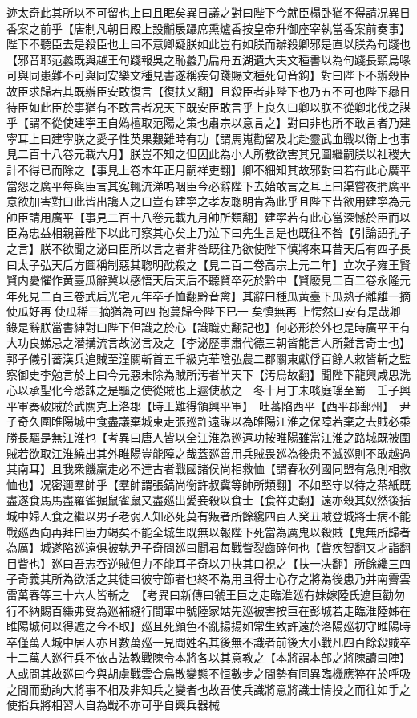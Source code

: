 迹太奇此其所以不可留也上曰且眠矣異日議之對曰陛下今就臣榻卧猶不得請况異日香案之前乎【唐制凡朝日殿上設黼扆躡席熏爐香按皇帝升御座宰執當香案前奏事】陛下不聽臣去是殺臣也上曰不意卿疑朕如此豈有如朕而辦殺卿邪是直以朕為句踐也【邪音耶范蠡既與越王句踐報吳之恥蠡乃扁舟五湖遺大夫文種書以為句踐長頸烏喙可與同患難不可與同安樂文種見書遂稱疾句踐賜文種死句音鉤】對曰陛下不辦殺臣故臣求歸若其既辦臣安敢復言【復扶又翻】且殺臣者非陛下也乃五不可也陛下曏日待臣如此臣於事猶有不敢言者况天下既安臣敢言乎上良久曰卿以朕不從卿北伐之謀乎【謂不從使建寜王自媯檀取范陽之策也肅宗以意言之】對曰非也所不敢言者乃建寜耳上曰建寜朕之愛子性英果艱難時有功【謂馬嵬勸留及北赴靈武血戰以衛上也事見二百十八卷元載六月】朕豈不知之但因此為小人所教欲害其兄圖繼嗣朕以社稷大計不得已而除之【事見上卷本年正月嗣祥吏翻】卿不細知其故邪對曰若有此心廣平當怨之廣平每與臣言其寃輒流涕嗚咽臣今必辭陛下去始敢言之耳上曰渠嘗夜捫廣平意欲加害對曰此皆出讒人之口豈有建寜之孝友聦明肯為此乎且陛下昔欲用建寜為元帥臣請用廣平【事見二百十八卷元載九月帥所類翻】建寜若有此心當深憾於臣而以臣為忠益相親善陛下以此可察其心矣上乃泣下曰先生言是也既往不咎【引論語孔子之言】朕不欲聞之泌曰臣所以言之者非咎既往乃欲使陛下慎將來耳昔天后有四子長曰太子弘天后方圖稱制惡其聦明酖殺之【見二百二卷高宗上元二年】立次子雍王賢賢内憂懼作黄臺瓜辭冀以感悟天后天后不聽賢卒死於黔中【賢廢見二百二卷永隆元年死見二百三卷武后光宅元年卒子恤翻黔音禽】其辭曰種瓜黄臺下瓜熟子離離一摘使瓜好再使瓜稀三摘猶為可四抱蔓歸今陛下已一矣慎無再上愕然曰安有是哉卿錄是辭朕當書紳對曰陛下但識之於心【識職吏翻記也】何必形於外也是時廣平王有大功良娣忌之潜搆流言故泌言及之【李泌歷事肅代德三朝皆能言人所難言奇士也】　郭子儀引蕃漢兵追賊至潼關斬首五千級克華陰弘農二郡關東獻俘百餘人敕皆斬之監察御史李勉言於上曰今元惡未除為賊所汚者半天下【汚烏故翻】聞陛下龍興咸思洗心以承聖化今悉誅之是驅之使從賊也上遽使赦之　冬十月丁未啖庭瑶至蜀　壬子興平軍奏破賊於武關克上洛郡【時王難得領興平軍】　吐蕃陷西平【西平郡鄯州】　尹子奇久圍睢陽城中食盡議棄城東走張廵許遠謀以為睢陽江淮之保障若棄之去賊必乘勝長驅是無江淮也【考異曰唐人皆以全江淮為廵遠功按睢陽雖當江淮之路城既被圍賊若欲取江淮繞出其外睢陽豈能障之哉蓋廵善用兵賊畏廵為後患不滅廵則不敢越過其南耳】且我衆饑羸走必不達古者戰國諸侯尚相救恤【謂春秋列國同盟有急則相救恤也】况密邇羣帥乎【羣帥謂張鎬尚衡許叔冀等帥所類翻】不如堅守以待之茶紙既盡遂食馬馬盡羅雀掘鼠雀鼠又盡廵出愛妾殺以食士【食祥史翻】遠亦殺其奴然後括城中婦人食之繼以男子老弱人知必死莫有叛者所餘纔四百人癸丑賊登城將士病不能戰廵西向再拜曰臣力竭矣不能全城生既無以報陛下死當為厲鬼以殺賊【鬼無所歸者為厲】城遂陷廵遠俱被執尹子奇問廵曰聞君每戰眥裂齒碎何也【眥疾智翻又才詣翻目眥也】廵曰吾志吞逆賊但力不能耳子奇以刀抉其口視之【扶一决翻】所餘纔三四子奇義其所為欲活之其徒曰彼守節者也終不為用且得士心存之將為後患乃并南霽雲雷萬春等三十六人皆斬之　【考異曰新傳曰虢王巨之走臨淮廵有妹嫁陸氏遮巨勸勿行不納賜百縑弗受為廵補縫行間軍中號陸家姑先廵被害按巨在彭城若走臨淮陸姊在睢陽城何以得遮之今不取】廵且死顔色不亂揚揚如常生致許遠於洛陽廵初守睢陽時卒僅萬人城中居人亦且數萬廵一見問姓名其後無不識者前後大小戰凡四百餘殺賊卒十二萬人廵行兵不依古法教戰陳令本將各以其意教之【本將謂本部之將陳讀曰陣】人或問其故廵曰今與胡虜戰雲合鳥散變態不恒數步之間勢有同異臨機應猝在於呼吸之間而動詢大將事不相及非知兵之變者也故吾使兵識將意將識士情投之而往如手之使指兵將相習人自為戰不亦可乎自興兵器械